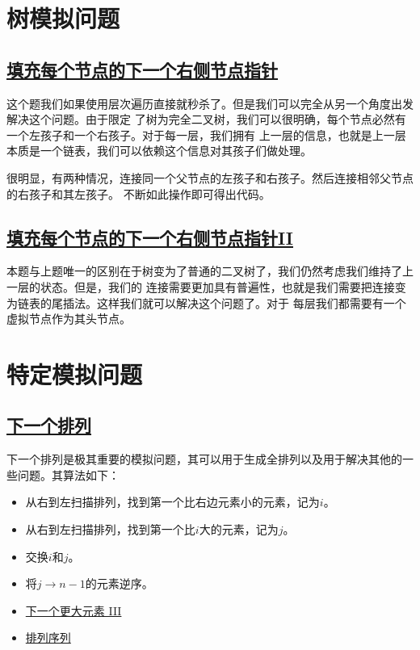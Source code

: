 \documentclass[../../main.tex]{subfiles}
\begin{document}
\section{树模拟问题}

\subsection{\href{https://leetcode.cn/problems/populating-next-right-pointers-in-each-node/}
{填充每个节点的下一个右侧节点指针}}

这个题我们如果使用层次遍历直接就秒杀了。但是我们可以完全从另一个角度出发解决这个问题。由于限定
了树为完全二叉树，我们可以很明确，每个节点必然有一个左孩子和一个右孩子。对于每一层，我们拥有
上一层的信息，也就是上一层本质是一个链表，我们可以依赖这个信息对其孩子们做处理。

很明显，有两种情况，连接同一个父节点的左孩子和右孩子。然后连接相邻父节点的右孩子和其左孩子。
不断如此操作即可得出代码。



\subsection{\href{https://leetcode.cn/problems/populating-next-right-pointers-in-each-node-ii/}
{填充每个节点的下一个右侧节点指针II}}

本题与上题唯一的区别在于树变为了普通的二叉树了，我们仍然考虑我们维持了上一层的状态。但是，我们的
连接需要更加具有普遍性，也就是我们需要把连接变为链表的尾插法。这样我们就可以解决这个问题了。对于
每层我们都需要有一个虚拟节点作为其头节点。



\section{特定模拟问题}

\subsection{\href{https://leetcode.cn/problems/next-permutation/}{下一个排列}}

下一个排列是极其重要的模拟问题，其可以用于生成全排列以及用于解决其他的一些问题。其算法如下：

\begin{itemize}
  \item 从右到左扫描排列，找到第一个比右边元素小的元素，记为$i$。
  \item 从右到左扫描排列，找到第一个比$i$大的元素，记为$j$。
  \item 交换$i$和$j$。
  \item 将$j \to n - 1$的元素逆序。
\end{itemize}



\begin{kaobox}[title=类似题目]
  \begin{itemize}
    \item \href{https://leetcode-cn.com/problems/next-greater-element-iii/}{下一个更大元素 III}
    \item \href{https://leetcode.cn/problems/permutation-sequence/}{排列序列}
  \end{itemize}
\end{kaobox}
\end{document}
